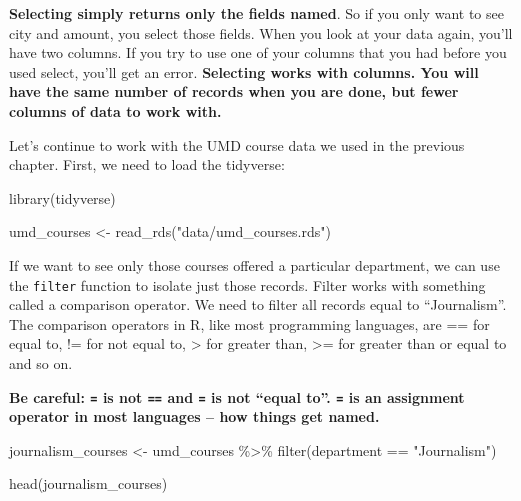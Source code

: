 \documentclass[
  letterpaper,
  DIV=11,
  numbers=noendperiod]{scrreprt}
\newenvironment{Shaded}{\begin{snugshade}}{\end{snugshade}}
\newcommand{\FunctionTok}[1]{\textcolor[rgb]{0.28,0.35,0.67}{#1}}
\newcommand{\NormalTok}[1]{\textcolor[rgb]{0.00,0.23,0.31}{#1}}
\newcommand{\OtherTok}[1]{\textcolor[rgb]{0.00,0.23,0.31}{#1}}
\newcommand{\SpecialCharTok}[1]{\textcolor[rgb]{0.37,0.37,0.37}{#1}}
\newcommand{\StringTok}[1]{\textcolor[rgb]{0.13,0.47,0.30}{#1}}
\begin{document}
\textbf{Selecting simply returns only the fields named}. So if you only
want to see city and amount, you select those fields. When you look at
your data again, you'll have two columns. If you try to use one of your
columns that you had before you used select, you'll get an error.
\textbf{Selecting works with columns. You will have the same number of
records when you are done, but fewer columns of data to work with.}

Let's continue to work with the UMD course data we used in the previous
chapter. First, we need to load the tidyverse:

\begin{Shaded}
\begin{Highlighting}[]
\FunctionTok{library}\NormalTok{(tidyverse)}
\end{Highlighting}
\end{Shaded}

\begin{Shaded}
\begin{Highlighting}[]
\NormalTok{umd\_courses }\OtherTok{\textless{}{-}} \FunctionTok{read\_rds}\NormalTok{(}\StringTok{"data/umd\_courses.rds"}\NormalTok{)}
\end{Highlighting}
\end{Shaded}

If we want to see only those courses offered a particular department, we
can use the \texttt{filter} function to isolate just those records.
Filter works with something called a comparison operator. We need to
filter all records equal to ``Journalism''. The comparison operators in
R, like most programming languages, are == for equal to, != for not
equal to, \textgreater{} for greater than, \textgreater= for greater
than or equal to and so on.

\textbf{Be careful: \texttt{=} is not \texttt{==} and \texttt{=} is not
``equal to''. \texttt{=} is an assignment operator in most languages --
how things get named.}

\begin{Shaded}
\begin{Highlighting}[]
\NormalTok{journalism\_courses }\OtherTok{\textless{}{-}}\NormalTok{ umd\_courses }\SpecialCharTok{\%\textgreater{}\%} \FunctionTok{filter}\NormalTok{(department }\SpecialCharTok{==} \StringTok{"Journalism"}\NormalTok{)}

\FunctionTok{head}\NormalTok{(journalism\_courses)}
\end{Highlighting}
\end{Shaded}
\end{document}

